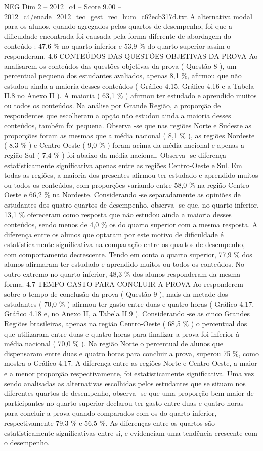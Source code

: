 \begin{textsample}{NEG Dim 2 – 2012\_c4 – Score 9.00 – 2012\_c4/enade\_2012\_tec\_gest\_rec\_hum\_c62ecb317d.txt}
A alternativa modal para os alunos, quando agregados pelos quartos de desempenho, foi que a dificuldade encontrada foi causada pela forma diferente de abordagem do conteúdo : 47,6 \% no quarto inferior e 53,9 \% do quarto superior assim o responderam. 4.6 CONTEÚDOS DAS QUESTÕES OBJETIVAS DA PROVA Ao analisarem os conteúdos das questões objetivas da prova ( Questão 8 ), um percentual pequeno dos estudantes avaliados, apenas 8,1 \%, afirmou que não estudou ainda a maioria desses conteúdos ( Gráfico 4.15, Gráfico 4.16 e a Tabela II.8 no Anexo II ).
A maioria ( 63,1 \% ) afirmou ter estudado e aprendido muitos ou todos os conteúdos.
Na análise por Grande Região, a proporção de respondentes que escolheram a opção não estudou ainda a maioria desses conteúdos, também foi pequena.
Observa -se que nas regiões Norte e Sudeste as proporções foram as mesmas que a média nacional ( 8,1 \% ), as regiões Nordeste ( 8,3 \% ) e Centro-Oeste ( 9,0 \% ) foram acima da média nacional e apenas a região Sul ( 7,4 \% ) foi abaixo da média nacional.
Observa -se diferença estatisticamente significativa apenas entre as regiões Centro-Oeste e Sul.
Em todas as regiões, a maioria dos presentes afirmou ter estudado e aprendido muitos ou todos os conteúdos, com proporções variando entre 58,0 \% na região Centro-Oeste e 66,2 \% na Nordeste.
Considerando -se separadamente as opiniões de estudantes dos quatro quartos de desempenho, observa -se que, no quarto inferior, 13,1 \% ofereceram como resposta que não estudou ainda a maioria desses conteúdos, sendo menos de 4,0 \% os do quarto superior com a mesma resposta.
A diferença entre os alunos que optaram por este motivo de dificuldade é estatisticamente significativa na comparação entre os quartos de desempenho, com comportamento decrescente.
Tendo em conta o quarto superior, 77,9 \% dos alunos afirmaram ter estudado e aprendido muitos ou todos os conteúdos.
No outro extremo no quarto inferior, 48,3 \% dos alunos responderam da mesma forma. 4.7 TEMPO GASTO PARA CONCLUIR A PROVA Ao responderem sobre o tempo de conclusão da prova ( Questão 9 ), mais da metade dos estudantes ( 70,0 \% ) afirmou ter gasto entre duas e quatro horas ( Gráfico 4.17, Gráfico 4.18 e, no Anexo II, a Tabela II.9 ).
Considerando -se as cinco Grandes Regiões brasileiras, apenas na região Centro-Oeste ( 68,5 \% ) o percentual dos que utilizaram entre duas e quatro horas para finalizar a prova foi inferior à média nacional ( 70,0 \% ).
Na região Norte o percentual de alunos que dispensaram entre duas e quatro horas para concluir a prova, superou 75 \%, como mostra o Gráfico 4.17.
A diferença entre as regiões Norte e Centro-Oeste, a maior e a menor proporção respectivamente, foi estatisticamente significativa.
Uma vez sendo analisadas as alternativas escolhidas pelos estudantes que se situam nos diferentes quartos de desempenho, observa -se que uma proporção bem maior de participantes no quarto superior declarou ter gasto entre duas e quatro horas para concluir a prova quando comparados com os do quarto inferior, respectivamente 79,3 \% e 56,5 \%.
As diferenças entre os quartos são estatisticamente significativas entre si, e evidenciam uma tendência crescente com o desempenho.


\end{textsample}

